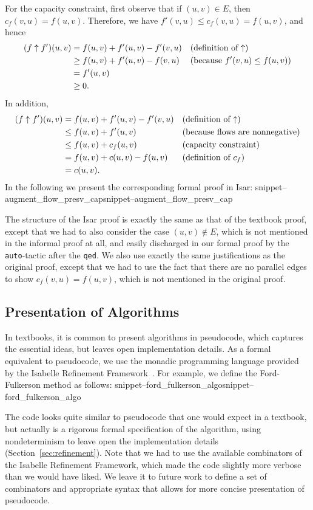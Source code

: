 \documentclass{llncs}
\newcommand{\isai}{\lstinline[language=isabelle,basicstyle=\normalsize\ttfamily\slshape]}
\newcommand{\Snippet}[1]{\ifcsname snippet--#1\endcsname\csname snippet--#1\endcsname\else\PackageError{}{No snippet '#1' defined.}{}\fi}
\begin{document}
For the capacity constraint, first observe that if $(u, v) \in E$, then $c_f(v, u) = f(u, v)$. Therefore, we have $f'(v,u) \leq c_f(v, u) = f(u, v)$, and hence
	\begin{align*}
	(f \uparrow f') (u, v) &= f(u, v) + f'(u, v) - f'(v, u)  && \text{(definition of ${\mathbin\uparrow}$)} \\
	& \geq f(u, v) + f'(u, v) - f(v, u) && \text{(because $f'(v,u) \leq f(u, v)$)} \\
	& = f'(u, v) \\
	& \geq 0.
	\end{align*}
In addition,
	\begin{align*}
	(f \uparrow f') (u, v) &= f(u, v) + f'(u, v) - f'(v, u)  && \text{(definition of ${\mathbin\uparrow}$)} \\
	& \leq f(u, v) + f'(u, v) && \text{(because flows are nonnegative)} \\
	& \leq f(u, v) + c_f(u, v) &&  \text{(capacity constraint)} \\
	& = f(u, v) + c(u, v) - f(u, v) && \text{(definition of $c_f$)} \\
	& = c (u, v).
	\end{align*}
% 
In the following we present the corresponding formal proof in Isar:
\Snippet{augment_flow_presv_cap}
The structure of the Isar proof is exactly the same as that of the textbook proof, except that we had to also consider the case $(u,v)\notin E$, which is not mentioned in the informal proof at all, and easily discharged in our formal proof by the \isai{auto}-tactic after the \isai{qed}. We also use exactly the same justifications as the original proof, except that we had to use the fact that there are no parallel edges to show $c_f(v,u)=f(u,v)$, which is not mentioned in the original proof.

\subsection{Presentation of Algorithms}
In textbooks, it is common to present algorithms in pseudocode, which captures the essential ideas, but leaves open implementation details. As a formal equivalent to pseudocode, we use the monadic programming language provided by the Isabelle Refinement Framework~\cite{LaTu12,La12}. For example, we define the Ford-Fulkerson method as follows:
\Snippet{ford_fulkerson_algo}

The code looks quite similar to pseudocode that one would expect in a textbook, but actually is a rigorous formal specification of the algorithm, using nondeterminism to leave open the implementation details (\cf Section~\ref{sec:refinement}). Note that we had to use the available combinators of the Isabelle Refinement Framework, which made the code slightly more verbose than we would have liked. We leave it to future work to define a set of combinators and appropriate syntax that allows for more concise presentation of pseudocode.
\end{document}
